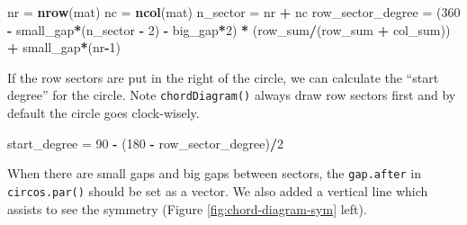 \documentclass[]{book}
\newenvironment{Shaded}{\begin{snugshade}}{\end{snugshade}}
\newcommand{\KeywordTok}[1]{\textcolor[rgb]{0.13,0.29,0.53}{\textbf{#1}}}
\newcommand{\DataTypeTok}[1]{\textcolor[rgb]{0.13,0.29,0.53}{#1}}
\newcommand{\DecValTok}[1]{\textcolor[rgb]{0.00,0.00,0.81}{#1}}
\newcommand{\StringTok}[1]{\textcolor[rgb]{0.31,0.60,0.02}{#1}}
\newcommand{\OperatorTok}[1]{\textcolor[rgb]{0.81,0.36,0.00}{\textbf{#1}}}
\newcommand{\NormalTok}[1]{#1}
\theoremstyle{definition}
\theoremstyle{definition}
\theoremstyle{remark}
\begin{document}
\begin{Shaded}
\begin{Highlighting}[]
\NormalTok{nr =}\StringTok{ }\KeywordTok{nrow}\NormalTok{(mat)}
\NormalTok{nc =}\StringTok{ }\KeywordTok{ncol}\NormalTok{(mat)}
\NormalTok{n_sector =}\StringTok{ }\NormalTok{nr }\OperatorTok{+}\StringTok{ }\NormalTok{nc}
\NormalTok{row_sector_degree =}\StringTok{ }\NormalTok{(}\DecValTok{360} \OperatorTok{-}\StringTok{ }\NormalTok{small_gap}\OperatorTok{*}\NormalTok{(n_sector }\OperatorTok{-}\StringTok{ }\DecValTok{2}\NormalTok{) }\OperatorTok{-}\StringTok{ }\NormalTok{big_gap}\OperatorTok{*}\DecValTok{2}\NormalTok{) }\OperatorTok{*}\StringTok{ }\NormalTok{(row_sum}\OperatorTok{/}\NormalTok{(row_sum }\OperatorTok{+}\StringTok{ }\NormalTok{col_sum)) }\OperatorTok{+}\StringTok{ }
\StringTok{                    }\NormalTok{small_gap}\OperatorTok{*}\NormalTok{(nr}\OperatorTok{-}\DecValTok{1}\NormalTok{)}
\end{Highlighting}
\end{Shaded}

If the row sectors are put in the right of the circle, we can calculate
the ``start degree'' for the circle. Note \texttt{chordDiagram()} always
draw row sectors first and by default the circle goes clock-wisely.

\begin{Shaded}
\begin{Highlighting}[]
\NormalTok{start_degree =}\StringTok{ }\DecValTok{90} \OperatorTok{-}\StringTok{ }\NormalTok{(}\DecValTok{180} \OperatorTok{-}\StringTok{ }\NormalTok{row_sector_degree)}\OperatorTok{/}\DecValTok{2}
\end{Highlighting}
\end{Shaded}

When there are small gaps and big gaps between sectors, the
\texttt{gap.after} in \texttt{circos.par()} should be set as a vector.
We also added a vertical line which assists to see the symmetry (Figure
\ref{fig:chord-diagram-sym} left).

\begin{Shaded}
\end{Shaded}
\end{document}
